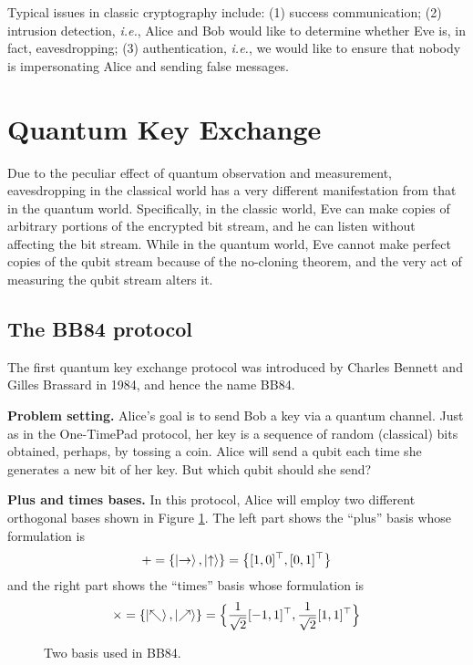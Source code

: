 \documentclass{easyclass}
\begin{document}
Typical issues in classic cryptography include: (1) success communication; (2) intrusion detection, \textit{i.e.}, Alice and Bob would like to determine whether Eve is, in fact, eavesdropping; (3) authentication, \textit{i.e.}, we would like to ensure that nobody is impersonating Alice and sending false messages.


\section{Quantum Key Exchange}
Due to the peculiar effect of quantum observation and measurement, eavesdropping in the classical world has a very different manifestation from that in the quantum world. Specifically, in the classic world, Eve can make copies of arbitrary portions of the encrypted bit stream, and he can listen without affecting the bit stream. While in the quantum world, Eve cannot make perfect copies of the qubit stream because of the no-cloning theorem, and the very act of measuring the qubit stream alters it. 

\subsection{The BB84 protocol}
The first quantum key exchange protocol was introduced by Charles Bennett
and Gilles Brassard in 1984, and hence the name BB84. 

\textbf{Problem setting.} Alice’s goal is to send Bob a key via a quantum channel. Just as in the One-TimePad protocol, her key is a sequence of random (classical) bits obtained, perhaps, by tossing a coin. Alice will send a qubit each time she generates a new bit of her key. But which qubit should she send?

\textbf{Plus and times bases.} In this protocol, Alice will employ two different orthogonal bases shown in Figure \ref{fig:plus-times-basis}. The left part shows the ``plus'' basis whose formulation is 
\begin{equation}
	+ = \{\ket{\rightarrow},\ket{\uparrow}\}=\big{\{}[1,0]^{\top},[0,1]^{\top}\big{\}}
\end{equation}
and the right part shows the ``times'' basis whose formulation is
\begin{equation}
	\times = \{\ket{\nwarrow},\ket{\nearrow}\}=\Big{\{}\frac{1}{\sqrt{2}}[-1,1]^{\top},\frac{1}{\sqrt{2}}[1,1]^{\top}\Big{\}}
\end{equation}

\begin{figure}[h]
	\centering
	\hspace{0.2\textwidth}
	\caption{Two basis used in BB84.}
	\label{fig:plus-times-basis}
\end{figure}
\end{document}
